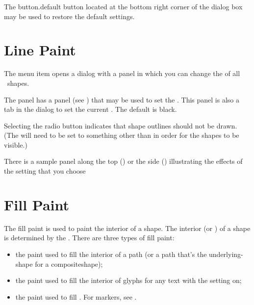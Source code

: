 The \gls{button.default} button located at the bottom right corner
of the dialog box may be used to restore the default settings.

\section{Line Paint}\label{sec:linepaint}


The  menu item opens a dialog
with a  panel in which
you can change the  
of all \selected\ \glspl{shape}.


The  panel has a  panel
(see ) that may be used to set the 
. This panel is also a tab
in the  dialog to set the current
.
The default  is black.

Selecting the  radio button indicates
that \gls{shape} outlines should not be drawn.  (The 
will need to be set to something other than
 in order for the \glspl{shape} to be
visible.)

There is a sample panel along the top ()
or the side () illustrating the
effects of the  setting that you choose

\section{Fill Paint}\label{sec:fillpaint}

The fill paint is used to paint the interior of a shape. The
interior (or ) of a shape is determined by the
. There are three types of fill paint:

\begin{itemize}
\item the paint used to fill the interior of a \gls{path} (or a path
that's the \gls{underlying-shape} for a \gls{compositeshape});

\item the paint used to fill the interior of glyphs for any text
with the  setting on; 

\item the paint used to fill . For markers, see
.

\end{itemize}

